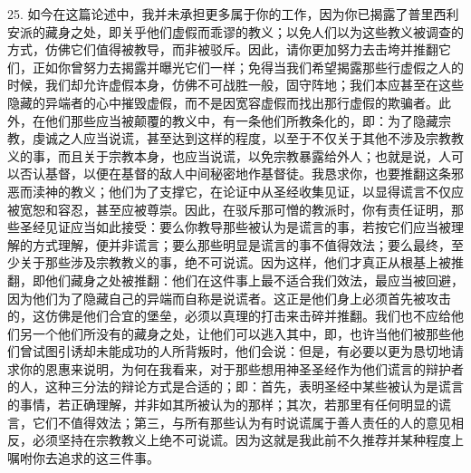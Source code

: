 25. 如今在这篇论述中，我并未承担更多属于你的工作，因为你已揭露了普里西利安派的藏身之处，即关乎他们虚假而乖谬的教义；以免人们以为这些教义被调查的方式，仿佛它们值得被教导，而非被驳斥。因此，请你更加努力去击垮并推翻它们，正如你曾努力去揭露并曝光它们一样；免得当我们希望揭露那些行虚假之人的时候，我们却允许虚假本身，仿佛不可战胜一般，固守阵地；我们本应甚至在这些隐藏的异端者的心中摧毁虚假，而不是因宽容虚假而找出那行虚假的欺骗者。此外，在他们那些应当被颠覆的教义中，有一条他们所教条化的，即：为了隐藏宗教，虔诚之人应当说谎，甚至达到这样的程度，以至于不仅关于其他不涉及宗教教义的事，而且关于宗教本身，也应当说谎，以免宗教暴露给外人；也就是说，人可以否认基督，以便在基督的敌人中间秘密地作基督徒。我恳求你，也要推翻这条邪恶而渎神的教义；他们为了支撑它，在论证中从圣经收集见证，以显得谎言不仅应被宽恕和容忍，甚至应被尊崇。因此，在驳斥那可憎的教派时，你有责任证明，那些圣经见证应当如此接受：要么你教导那些被认为是谎言的事，若按它们应当被理解的方式理解，便并非谎言；要么那些明显是谎言的事不值得效法；要么最终，至少关于那些涉及宗教教义的事，绝不可说谎。因为这样，他们才真正从根基上被推翻，即他们藏身之处被推翻：他们在这件事上最不适合我们效法，最应当被回避，因为他们为了隐藏自己的异端而自称是说谎者。这正是他们身上必须首先被攻击的，这仿佛是他们合宜的堡垒，必须以真理的打击来击碎并推翻。我们也不应给他们另一个他们所没有的藏身之处，让他们可以逃入其中，即，也许当他们被那些他们曾试图引诱却未能成功的人所背叛时，他们会说：但是，有必要以更为恳切地请求你的恩惠来说明，为何在我看来，对于那些想用神圣圣经作为他们谎言的辩护者的人，这种三分法的辩论方式是合适的；即：首先，表明圣经中某些被认为是谎言的事情，若正确理解，并非如其所被认为的那样；其次，若那里有任何明显的谎言，它们不值得效法；第三，与所有那些认为有时说谎属于善人责任的人的意见相反，必须坚持在宗教教义上绝不可说谎。因为这就是我此前不久推荐并某种程度上嘱咐你去追求的这三件事。\par

